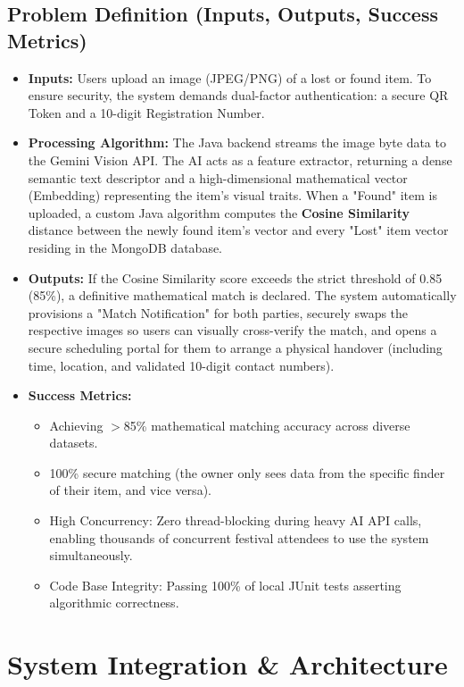 \documentclass[12pt,a4paper]{article}
\begin{document}
\subsection{Problem Definition (Inputs, Outputs, Success Metrics)}
\begin{itemize}
    \item \textbf{Inputs:} Users upload an image (JPEG/PNG) of a lost or found item. To ensure security, the system demands dual-factor authentication: a secure QR Token and a 10-digit Registration Number.
    \item \textbf{Processing Algorithm:} The Java backend streams the image byte data to the Gemini Vision API. The AI acts as a feature extractor, returning a dense semantic text descriptor and a high-dimensional mathematical vector (Embedding) representing the item's visual traits. When a "Found" item is uploaded, a custom Java algorithm computes the \textbf{Cosine Similarity} distance between the newly found item's vector and every "Lost" item vector residing in the MongoDB database.
    \item \textbf{Outputs:} If the Cosine Similarity score exceeds the strict threshold of 0.85 (85\%), a definitive mathematical match is declared. The system automatically provisions a "Match Notification" for both parties, securely swaps the respective images so users can visually cross-verify the match, and opens a secure scheduling portal for them to arrange a physical handover (including time, location, and validated 10-digit contact numbers).
    \item \textbf{Success Metrics:} 
    \begin{itemize}
        \item Achieving $>$85\% mathematical matching accuracy across diverse datasets.
        \item 100\% secure matching (the owner only sees data from the specific finder of their item, and vice versa).
        \item High Concurrency: Zero thread-blocking during heavy AI API calls, enabling thousands of concurrent festival attendees to use the system simultaneously.
        \item Code Base Integrity: Passing 100\% of local JUnit tests asserting algorithmic correctness.
    \end{itemize}
\end{itemize}

\section{System Integration \& Architecture}
\end{document}
